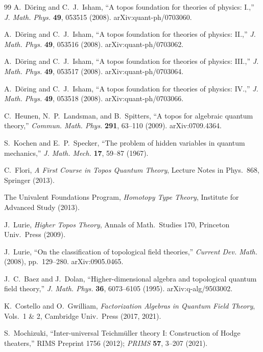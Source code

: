 \documentclass[12pt,a4paper]{article}
\theoremstyle{definition}
\begin{document}
\begin{thebibliography}{99}
A.~D\"{o}ring and C.~J.~Isham, ``A topos foundation for theories of physics: I.,'' \textit{J. Math. Phys.} \textbf{49}, 053515 (2008). arXiv:quant-ph/0703060.

A.~D\"{o}ring and C.~J.~Isham, ``A topos foundation for theories of physics: II.,'' \textit{J. Math. Phys.} \textbf{49}, 053516 (2008). arXiv:quant-ph/0703062.

A.~D\"{o}ring and C.~J.~Isham, ``A topos foundation for theories of physics: III.,'' \textit{J. Math. Phys.} \textbf{49}, 053517 (2008). arXiv:quant-ph/0703064.

A.~D\"{o}ring and C.~J.~Isham, ``A topos foundation for theories of physics: IV.,'' \textit{J. Math. Phys.} \textbf{49}, 053518 (2008). arXiv:quant-ph/0703066.

C.~Heunen, N.~P.~Landsman, and B.~Spitters, ``A topos for algebraic quantum theory,'' \textit{Commun. Math. Phys.} \textbf{291}, 63--110 (2009). arXiv:0709.4364.

S.~Kochen and E.~P.~Specker, ``The problem of hidden variables in quantum mechanics,'' \textit{J. Math. Mech.} \textbf{17}, 59--87 (1967).

C.~Flori, \textit{A First Course in Topos Quantum Theory}, Lecture Notes in Phys.~868, Springer (2013).

The Univalent Foundations Program, \textit{Homotopy Type Theory}, Institute for Advanced Study (2013).

J.~Lurie, \textit{Higher Topos Theory}, Annals of Math.~Studies 170, Princeton Univ.~Press (2009).

J.~Lurie, ``On the classification of topological field theories,'' \textit{Current Dev. Math.} (2008), pp.~129--280. arXiv:0905.0465.

J.~C.~Baez and J.~Dolan, ``Higher-dimensional algebra and topological quantum field theory,'' \textit{J. Math. Phys.} \textbf{36}, 6073--6105 (1995). arXiv:q-alg/9503002.

K.~Costello and O.~Gwilliam, \textit{Factorization Algebras in Quantum Field Theory}, Vols.~1 \& 2, Cambridge Univ.~Press (2017, 2021).

S.~Mochizuki, ``Inter-universal Teichm\"{u}ller theory I: Construction of Hodge theaters,'' RIMS Preprint 1756 (2012); \textit{PRIMS} \textbf{57}, 3--207 (2021).


\end{thebibliography}
\end{document}
